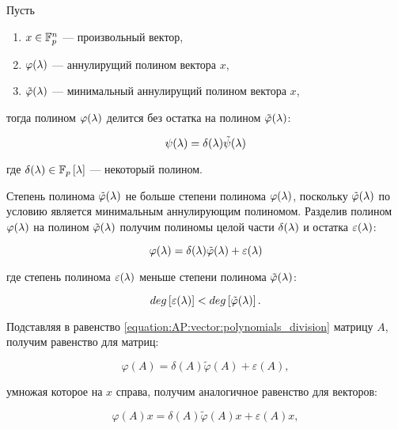 \begin{statement} \label{statement:AP:vector:polynomials_division}
	Пусть
	\begin{enumerate}
		\item $x \in \mathbb{F}^{n}_p$ --- произвольный вектор,
		\item $\varphi (\lambda)$ --- аннулирущий полином вектора $x$,
		\item $\tilde\varphi (\lambda)$ --- минимальный аннулирущий полином вектора $x$,
	\end{enumerate}
	тогда полином $\varphi (\lambda)$ делится без остатка на полином $\tilde\varphi (\lambda)$:

		$$ \psi (\lambda) = \delta (\lambda) \tilde\psi (\lambda) $$

	где $\delta (\lambda) \in \mathbb{F}_p \left [ \lambda \right ]$ --- некоторый полином.

	\proof

	Степень полинома $\tilde\varphi (\lambda)$ не больше степени полинома $\varphi (\lambda)$, поскольку $\tilde\varphi (\lambda)$
	по условию является минимальным аннулирующим полиномом. Разделив полином $\varphi (\lambda)$ на полином $\tilde\varphi (\lambda)$
	получим полиномы целой части $\delta (\lambda)$ и остатка $\varepsilon (\lambda)$:

		\begin{equation} \label{equation:AP:vector:polynomials_division}
			\varphi (\lambda) = \delta (\lambda) \tilde\varphi (\lambda) + \varepsilon (\lambda)
		\end{equation}

	где степень полинома $\varepsilon (\lambda)$ меньше степени полинома $\tilde\varphi (\lambda)$:

		\begin{equation} \label{equation:AP:vector:remainder_polynomial_degree}
			deg \left [ \varepsilon (\lambda) \right ] < deg \left [ \tilde\varphi (\lambda) \right ].
		\end{equation}

	Подставляя в равенство \eqref{equation:AP:vector:polynomials_division} матрицу $A$, получим равенство для матриц:

		$$ \varphi(A) = \delta(A) \tilde\varphi(A) + \varepsilon(A), $$

	умножая которое на $x$ справа, получим аналогичное равенство для векторов:

		$$ \varphi(A) x = \delta(A) \tilde\varphi(A) x + \varepsilon(A) x, $$


\end{statement}
